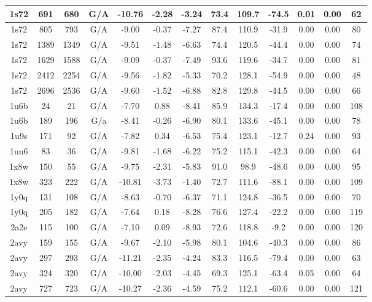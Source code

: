 {\begin{center}
\begin{longtable}{|c|c|c|c|c|c|c|c|c|c|c|c|c|}
1s72 & 691 & 680 & G/A & -10.76 & -2.28 & -3.24 & 73.4 & 109.7 & -74.5 & 0.01 & 0.00 & 62 \\ \hline
1s72 & 805 & 793 & G/A & -9.00 & -0.37 & -7.27 & 87.4 & 110.9 & -31.9 & 0.00 & 0.00 & 80 \\ \hline
1s72 & 1389 & 1349 & G/A & -9.51 & -1.48 & -6.63 & 74.4 & 120.5 & -44.4 & 0.00 & 0.00 & 74 \\ \hline
1s72 & 1629 & 1588 & G/A & -9.09 & -0.37 & -7.49 & 93.6 & 119.6 & -34.7 & 0.00 & 0.00 & 81 \\ \hline
1s72 & 2412 & 2254 & G/A & -9.56 & -1.82 & -5.33 & 70.2 & 128.1 & -54.9 & 0.00 & 0.00 & 48 \\ \hline
1s72 & 2696 & 2536 & G/A & -9.60 & -1.52 & -6.88 & 82.8 & 129.8 & -44.5 & 0.00 & 0.00 & 66 \\ \hline
1u6b & 24 & 21 & G/A & -7.70 & 0.88 & -8.41 & 85.9 & 134.3 & -17.4 & 0.00 & 0.00 & 108 \\ \hline
1u6b & 189 & 196 & G/a & -8.41 & -0.26 & -6.90 & 80.1 & 133.6 & -45.1 & 0.00 & 0.00 & 78 \\ \hline
1u9s & 171 & 92 & G/A & -7.82 & 0.34 & -6.53 & 75.4 & 123.1 & -12.7 & 0.24 & 0.00 & 93 \\ \hline
1un6 & 83 & 36 & G/A & -9.81 & -1.68 & -6.22 & 75.2 & 115.1 & -42.3 & 0.00 & 0.00 & 64 \\ \hline
1x8w & 150 & 55 & G/A & -9.75 & -2.31 & -5.83 & 91.0 & 98.9 & -48.6 & 0.00 & 0.00 & 95 \\ \hline
1x8w & 323 & 222 & G/A & -10.81 & -3.73 & -1.40 & 72.7 & 111.6 & -88.1 & 0.00 & 0.00 & 109 \\ \hline
1y0q & 131 & 108 & G/A & -8.63 & -0.70 & -6.37 & 71.1 & 124.8 & -36.5 & 0.00 & 0.00 & 70 \\ \hline
1y0q & 205 & 182 & G/A & -7.64 & 0.18 & -8.28 & 76.6 & 127.4 & -22.2 & 0.00 & 0.00 & 119 \\ \hline
2a2e & 115 & 100 & G/A & -7.10 & 0.09 & -8.93 & 72.6 & 118.8 & -9.2 & 0.00 & 0.00 & 120 \\ \hline
2avy & 159 & 155 & G/A & -9.67 & -2.10 & -5.98 & 80.1 & 104.6 & -40.3 & 0.00 & 0.00 & 86 \\ \hline
2avy & 297 & 293 & G/A & -11.21 & -2.35 & -4.24 & 83.3 & 116.5 & -79.4 & 0.00 & 0.00 & 63 \\ \hline
2avy & 324 & 320 & G/A & -10.00 & -2.03 & -4.45 & 69.3 & 125.1 & -63.4 & 0.05 & 0.00 & 64 \\ \hline
2avy & 727 & 723 & G/A & -10.27 & -2.36 & -4.59 & 75.2 & 112.1 & -60.6 & 0.00 & 0.00 & 121 \\ \hline

\end{longtable}
\end{center}}

